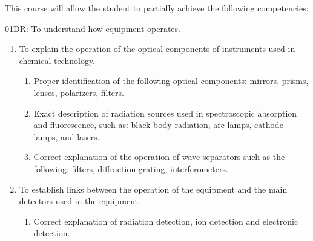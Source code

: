 {This course will allow the student to partially achieve the following competencies:

01DR: To understand how equipment operates.
\begin{enumerate}
\item To explain the operation of the optical components of instruments used in chemical technology.
\begin{enumerate}
	\item Proper identification of the following optical components: mirrors, prisms, lenses, polarizers, filters.
	\item Exact description of radiation sources used in spectroscopic absorption and fluorescence, such as: black body radiation, arc lamps, cathode lamps, and lasers.
	\item Correct explanation of the operation of wave separators such as the following: filters, diffraction grating, interferometers.
\end{enumerate}
\item To establish links between the operation of the equipment and the main detectors used in the equipment.
\begin{enumerate}
	\item Correct explanation of radiation detection, ion detection and electronic detection.
\end{enumerate}
\end{enumerate}
\smallskip

}